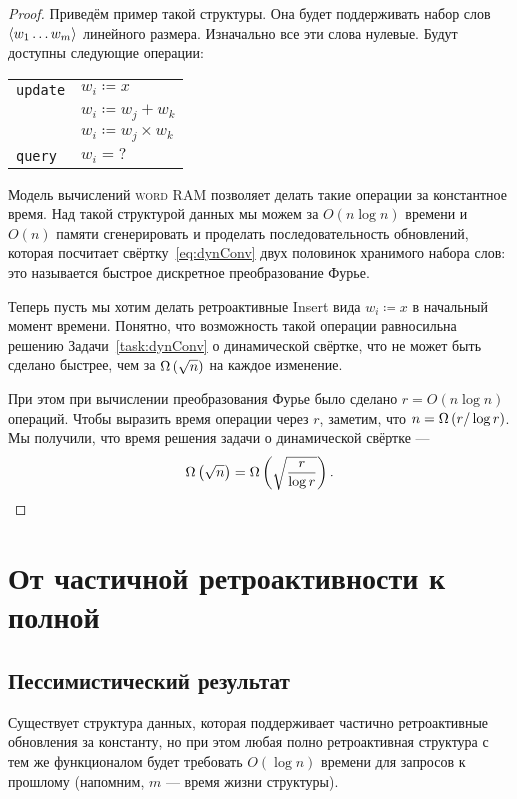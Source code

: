 \begin{proof}
	Приведём пример такой структуры. Она будет поддерживать набор слов $\left\langle w_1 \ldots w_m \right\rangle$ линейного размера. Изначально все эти слова нулевые. Будут доступны следующие операции:

\begin{center} \begin{tabular}{ll}
	{\tt update} & $w_i \coloneqq x$ \\
		& $w_i \coloneqq w_j + w_k$ \\
		& $w_i \coloneqq w_j \times w_k$ \\
	{\tt query} & $w_i = \text{?}$
\end{tabular} \end{center}

	Модель вычислений {\scshape word RAM} позволяет делать такие операции за константное время. Над такой структурой данных мы можем за $O(n \log n)$ времени и $O(n)$ памяти сгенерировать и проделать последовательность обновлений, которая посчитает свёртку~\eqref{eq:dynConv} двух половинок хранимого набора слов: это называется быстрое дискретное преобразование Фурье.
	
	Теперь пусть мы хотим делать ретроактивные Insert вида $w_i \coloneqq x$ в начальный момент времени. Понятно, что возможность такой операции равносильна решению Задачи~\ref{task:dynConv} о динамической свёртке, что не может быть сделано быстрее, чем за $\Omega \left( \sqrt{n} \right)$ на каждое изменение.
	
	При этом при вычислении преобразования Фурье было сделано $r = O(n \log n)$ операций. Чтобы выразить время операции через $r$, заметим, что $n = \Omega \left( r / \log r \right)$. Мы получили, что время решения задачи о динамической свёртке —
     \begin{equation*}
	\Omega \left( \sqrt{n} \right) = \Omega \left( \sqrt{\frac{r}{\log r}} \right).
     \end{equation*}
\end{proof}

\section{От частичной ретроактивности к полной} 
\subsection{Пессимистический результат}

\begin{theorem}
	Существует структура данных, которая поддерживает частично ретроактивные обновления за константу, но при этом любая полно ретроактивная структура с тем же функционалом будет требовать $O(\log n)$ времени для запросов к прошлому (напомним, $m$ — время жизни структуры).
\end{theorem}

